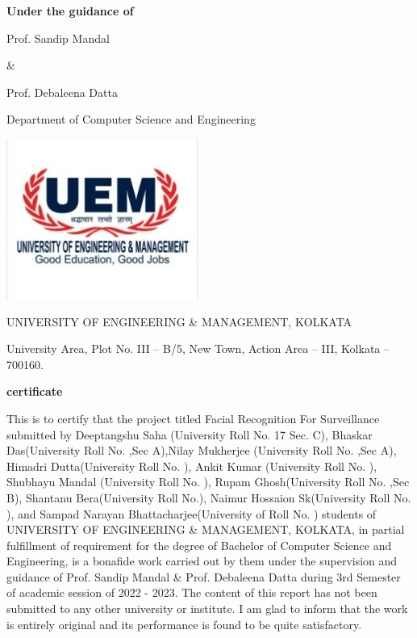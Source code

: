 \documentclass[14.49pt, a4paper, one side, margin = 2in]{article}
\begin{document}
\begin{center}
\par \textbf{Under the guidance of} 
\par Prof. Sandip Mandal
\par \&
\par Prof. Debaleena Datta 
\par Department of Computer Science and Engineering
\end{center}
\begin{center}
\includegraphics[]{chota_uem.jpg}
\end{center}
\begin{center}
\par UNIVERSITY OF ENGINEERING \& MANAGEMENT, KOLKATA
\par University Area, Plot No. III – B/5, New Town, Action Area – III, Kolkata – 700160.
\end{center}
\clearpage
\begin{center}
\par \textbf{certificate} 
\par This is to certify that the project titled Facial Recognition For Surveillance submitted by Deeptangshu Saha (University Roll No. 17 Sec. C), Bhaskar Das(University Roll No. ,Sec A),Nilay Mukherjee (University Roll No. ,Sec A), Himadri Dutta(University Roll No. ), Ankit Kumar (University Roll No. ), Shubhayu Mandal (University Roll No. ), Rupam Ghosh(University Roll No. ,Sec B), Shantanu Bera(University Roll No.), Naimur Hossaion Sk(University Roll No. ), and Sampad Narayan Bhattacharjee(University of Roll No. ) students of UNIVERSITY OF ENGINEERING \& MANAGEMENT, KOLKATA, in partial fulfillment of requirement for the degree of Bachelor of Computer Science and Engineering, is a bonafide work carried out by them under the supervision and guidance of Prof. Sandip Mandal \& Prof. Debaleena Datta during 3rd Semester of academic session of 2022 - 2023. The content of this report has not been submitted to any other university or institute. I am glad to inform that the work is entirely original and its performance is found to be quite satisfactory.
\end{center}
\end{document}
